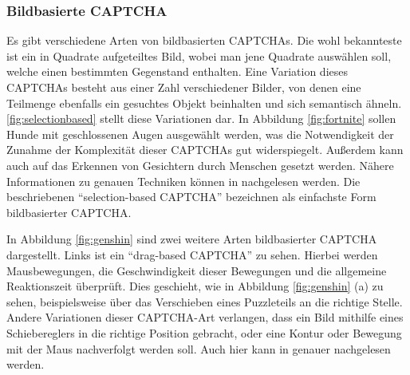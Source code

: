 \subsubsection*{Bildbasierte CAPTCHA}
Es gibt verschiedene Arten von bildbasierten CAPTCHAs. 
Die wohl bekannteste ist ein in Quadrate aufgeteiltes Bild, wobei man jene Quadrate auswählen soll, welche einen bestimmten Gegenstand enthalten.
Eine Variation dieses CAPTCHAs besteht aus einer Zahl verschiedener Bilder, von denen eine Teilmenge ebenfalls ein gesuchtes Objekt beinhalten 
und sich semantisch ähneln. 
\autoref{fig:selectionbased} stellt diese Variationen dar.
In Abbildung \ref{fig:fortnite} sollen Hunde mit geschlossenen Augen ausgewählt werden,
was die Notwendigkeit der Zunahme der Komplexität dieser CAPTCHAs gut widerspiegelt. 
Außerdem kann auch auf das Erkennen von Gesichtern durch Menschen gesetzt werden.
Nähere Informationen zu genauen Techniken können in \cite[p.xx]{surveyofresearch} nachgelesen werden.
Die beschriebenen ``selection-based CAPTCHA'' bezeichnen \citeauthor{surveyofresearch} als einfachste Form bildbasierter CAPTCHA. \cite[p.77]{surveyofresearch}

In Abbildung \ref{fig:genshin} sind zwei weitere Arten bildbasierter CAPTCHA dargestellt.
Links ist ein ``drag-based CAPTCHA'' zu sehen.
Hierbei werden Mausbewegungen, die Geschwindigkeit dieser Bewegungen
und die allgemeine Reaktionszeit überprüft.
Dies geschieht, wie in Abbildung \ref{fig:genshin} (a) zu sehen,
beispielsweise über das Verschieben eines Puzzleteils an die richtige Stelle.
Andere Variationen dieser CAPTCHA-Art verlangen, dass ein Bild mithilfe eines Schiebereglers in die richtige Position gebracht,
oder eine Kontur oder Bewegung mit der Maus nachverfolgt werden soll.
Auch hier kann in \cite[p.77]{surveyofresearch} genauer nachgelesen werden.

